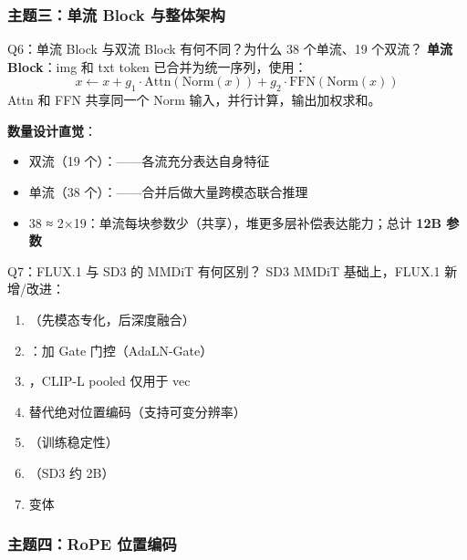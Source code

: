 \subsubsection{主题三：单流 Block 与整体架构}

\begin{conceptbox}{Q6：单流 Block 与双流 Block 有何不同？为什么 38 个单流、19 个双流？}
\textbf{单流 Block}：img 和 txt token 已合并为统一序列，使用：
\[
x \leftarrow x + g_1 \cdot \text{Attn}(\text{Norm}(x)) + g_2 \cdot \text{FFN}(\text{Norm}(x))
\]
Attn 和 FFN 共享同一个 Norm 输入，并行计算，输出加权求和。

\textbf{数量设计直觉}：
\begin{itemize}
  \item 双流（19 个）：——各流充分表达自身特征
  \item 单流（38 个）：——合并后做大量跨模态联合推理
  \item 38 ≈ 2×19：单流每块参数少（共享），堆更多层补偿表达能力；总计 \textbf{12B 参数}
\end{itemize}
\end{conceptbox}

\begin{conceptbox}{Q7：FLUX.1 与 SD3 的 MMDiT 有何区别？}
SD3 MMDiT 基础上，FLUX.1 新增/改进：
\begin{enumerate}
  \item {}（先模态专化，后深度融合）
  \item {}：加 Gate 门控（AdaLN-Gate）
  \item {}，CLIP-L pooled 仅用于 vec
  \item {} 替代绝对位置编码（支持可变分辨率）
  \item {}（训练稳定性）
  \item {}（SD3 约 2B）
  \item {}变体
\end{enumerate}
\end{conceptbox}

\subsubsection{主题四：RoPE 位置编码}


